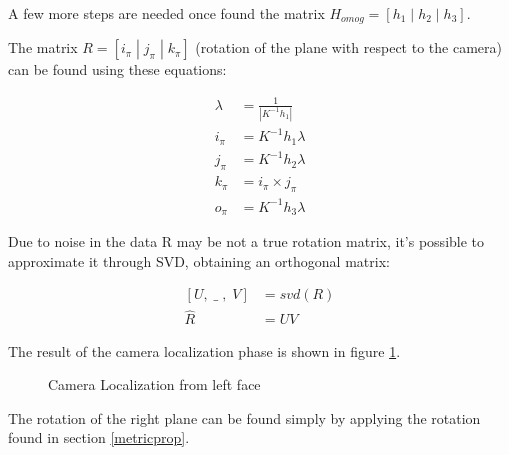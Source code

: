 \documentclass[11pt, oneside]{article}   	%
\begin{document}
A few more steps are needed once found the matrix $H_{omog} = [h_1\; |\; h_2\; |\; h_3]$. 

The matrix $R=[i_\pi\; | \; j_\pi \; | \; k_\pi]$ (rotation of the plane with respect to the camera) can be found using these equations:

\begin{subequations}
\begin{align*}
\lambda &= \frac{1}{|K^{-1}h_1|} \\
i_\pi &= K^{-1}h_1\lambda \\
j_\pi &= K^{-1}h_2\lambda \\
k_\pi &= i_\pi \times j_\pi  \\
o_\pi &= K^{-1} h_3 \lambda
\end{align*}
\end{subequations}

Due to noise in the data R may be not a true rotation matrix, it's possible to approximate it through SVD, obtaining an orthogonal matrix:

\begin{subequations}
\begin{align*}
[U,\; \_\;,\;V] &= svd(R) \\
\hat{R} &= UV
\end{align*}
\end{subequations}

The result of the camera localization phase is shown in figure \ref{left_loc}.

\begin{figure}
 \centering
    \qquad
    \caption{Camera Localization from left face}%
    \label{left_loc}%
\end{figure}

The rotation of the right plane can be found simply by applying the rotation found in section \ref{metricprop}.
\end{document}
